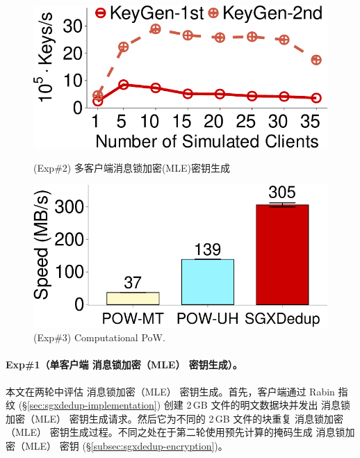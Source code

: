\begin{figure}[!htb]
  \begin{minipage}[t]{0.47\textwidth}
  \centering
  \includegraphics[width=\linewidth]{pic/sgxdedup/expa3_keyScale_performance_number_multiThread.pdf}
  \caption{(Exp\#2) 多客户端消息锁加密(MLE)密钥生成}
  \label{fig:sgxdedup-exp-keygen-scalability}
  \end{minipage}%
  \hspace{0.2in}
  \begin{minipage}[t]{0.47\textwidth}
  \centering
  \includegraphics[width=\linewidth]{pic/sgxdedup/expa4_powPerformance.pdf}
  \caption{\small(Exp\#3) Computational PoW.}
  \label{fig:sgxdedup-pow-comparison}
  \end{minipage}%
\end{figure}


\paragraph*{Exp\#1（单客户端 消息锁加密（MLE） 密钥生成）。} 本文在两轮中评估 消息锁加密（MLE） 密钥生成。首先，客户端通过 Rabin 指纹 (\S\ref{sec:sgxdedup-implementation}) 创建 2\,GB 文件的明文数据块并发出 消息锁加密（MLE） 密钥生成请求。然后它为不同的 2\,GB 文件的块重复 消息锁加密（MLE） 密钥生成过程。不同之处在于第二轮使用预先计算的掩码生成 消息锁加密（MLE） 密钥 (\S\ref{subsec:sgxdedup-encryption})。

